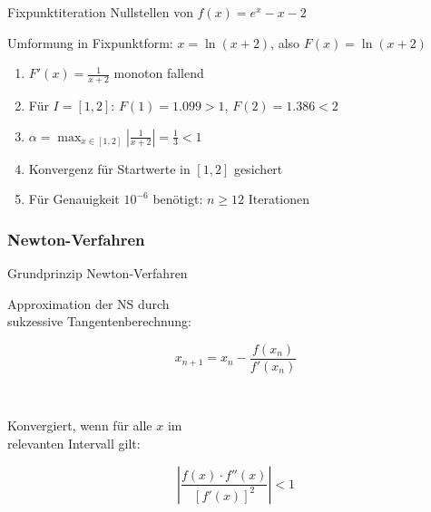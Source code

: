 \begin{example2}{Fixpunktiteration} Nullstellen von $f(x)=e^x - x - 2$

Umformung in Fixpunktform: $x = \ln(x+2)$, also $F(x)=\ln(x+2)$
\begin{enumerate}
    \item $F'(x) = \frac{1}{x+2}$ monoton fallend
    \item Für $I=[1,2]$: $F(1)=1.099 > 1$, $F(2)=1.386 < 2$
    \item $\alpha = \max_{x \in [1,2]} |\frac{1}{x+2}| = \frac{1}{3} < 1$
    \item Konvergenz für Startwerte in $[1,2]$ gesichert
    \item Für Genauigkeit $10^{-6}$ benötigt: $n \geq 12$ Iterationen
\end{enumerate}
\end{example2}



\subsubsection{Newton-Verfahren}

\begin{concept}{Grundprinzip Newton-Verfahren}
    \vspace{-2mm}\\
\begin{minipage}[t]{0.6\textwidth}
    Approximation der NS durch \\ sukzessive Tangentenberechnung:
\end{minipage}
\begin{minipage}{0.3\textwidth}
    \vspace{-3mm}
    $$x_{n+1} = x_n - \frac{f(x_n)}{f'(x_n)}$$
\end{minipage}
\vspace{-2mm}\\
\begin{minipage}[t]{0.6\textwidth}
    Konvergiert, wenn für alle $x$ im \\ relevanten Intervall gilt:
\end{minipage}
\begin{minipage}{0.3\textwidth}
    \vspace{-3mm}
    $$\left|\frac{f(x) \cdot f''(x)}{[f'(x)]^2}\right| < 1$$
\end{minipage}
\end{concept}

